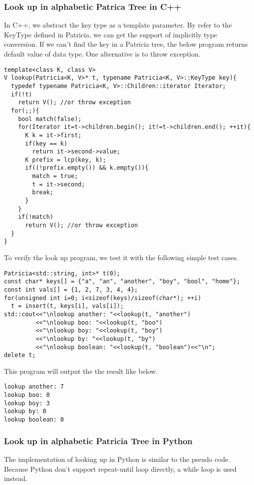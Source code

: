 \documentclass{article}
\begin{document}
\subsubsection*{Look up in alphabetic Patrica Tree in C++}
In C++, we abstract the key type as a template parameter. By refer to
the KeyType defined in Patricia, we can get the support of implicitly
type conversion. If we can't find the key in a Patricia tree, the
below program returns default value of data type. One alternative is
to throw exception.

\lstset{language=C++}
\begin{lstlisting}
template<class K, class V>
V lookup(Patricia<K, V>* t, typename Patricia<K, V>::KeyType key){
  typedef typename Patricia<K, V>::Children::iterator Iterator;
  if(!t)
    return V(); //or throw exception
  for(;;){
    bool match(false);
    for(Iterator it=t->children.begin(); it!=t->children.end(); ++it){
      K k = it->first;
      if(key == k)
        return it->second->value;
      K prefix = lcp(key, k);
      if((!prefix.empty()) && k.empty()){
        match = true;
        t = it->second;
        break;
      }
    }
    if(!match)
      return V(); //or throw exception
  }
}
\end{lstlisting}

To verify the look up program, we test it with the following simple
test cases.

\begin{lstlisting}
Patricia<std::string, int>* t(0);
const char* keys[] = {"a", "an", "another", "boy", "bool", "home"};
const int vals[] = {1, 2, 7, 3, 4, 4};
for(unsigned int i=0; i<sizeof(keys)/sizeof(char*); ++i)
  t = insert(t, keys[i], vals[i]);
std::cout<<"\nlookup another: "<<lookup(t, "another")
         <<"\nlookup boo: "<<lookup(t, "boo")
         <<"\nlookup boy: "<<lookup(t, "boy")
         <<"\nlookup by: "<<lookup(t, "by")
         <<"\nlookup boolean: "<<lookup(t, "boolean")<<"\n";
delete t;
\end{lstlisting}

This program will output the the result like below.

\begin{verbatim}
lookup another: 7
lookup boo: 0
lookup boy: 3
lookup by: 0
lookup boolean: 0
\end{verbatim}

\subsubsection*{Look up in alphabetic Patricia Tree in Python}
The implementation of looking up in Python is similar to the pseudo code.
Because Python don't support repeat-until loop directly, a while loop is
used instead.
\end{document}
